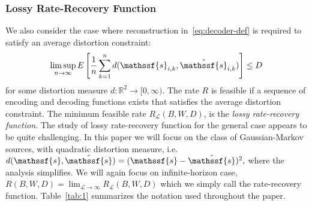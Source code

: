 \documentclass[journal, twocolumn, 10pt]{IEEEtran}
\newcommand{\rvs}{{\mathssf{s}}}    %
\begin{document}
\subsubsection{Lossy Rate-Recovery Function}
We also consider the case where reconstruction in~\eqref{eq:decoder-def} is required to satisfy an average distortion constraint:
\begin{align}
\limsup_{n\to \infty} E\left[ \frac{1}{n}\sum_{k=1}^n d(\rvs_{i,k},\hat{\rvs}_{i,k})\right] \le D \label{eq:D-def}
\end{align} for some distortion measure $d:\mathbb{R}^2 \rightarrow [0,\infty)$.
The rate $R$ is feasible if a sequence of encoding and decoding functions exists that satisfies the average distortion constraint. The minimum feasible rate $R_{\mathcal{L}}(B, W, D)$, is the {\em lossy rate-recovery function}.  
The study of lossy rate-recovery function for the general case appears to be quite challenging. 
In this paper we will focus on the class of Gaussian-Markov sources, with quadratic distortion measure, i.e. $d(\rvs,\hat{\rvs}) = (\rvs-\hat{\rvs})^2,$ where the analysis simplifies.
We will again focus on infinite-horizon case, $R(B,W,D) =\lim_{\mathcal{L}\to\infty}R_{\mathcal{L}}(B,W,D)$ which we simply call the rate-recovery function.
Table~\ref{tab:1} summarizes the  notation used throughout the paper. 
\end{document}
